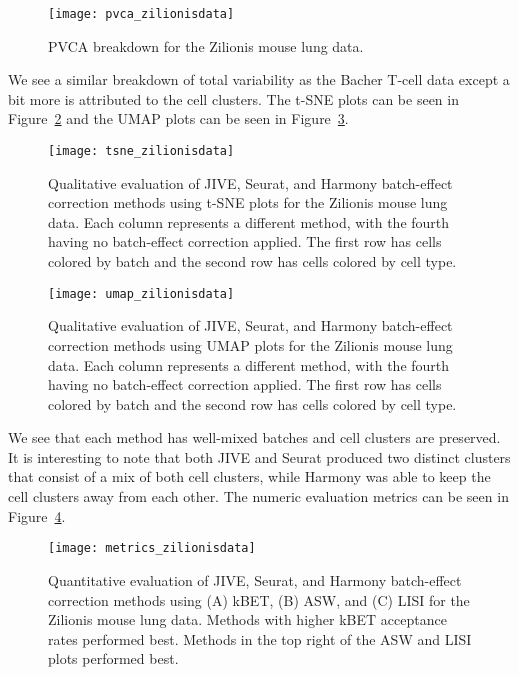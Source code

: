 \documentclass[
12pt, %
letterpaper, %
oneside, %
headinclude,footinclude, %
BCOR5mm, %
]{scrartcl}
\begin{document}
\begin{figure}[H]
    \centering 
    \texttt{[image: pvca\_zilionisdata]} 
    \caption[PVCA Breakdown for the Zilionis Mouse Lung Data]{PVCA breakdown for the Zilionis mouse lung data.}
    \label{fig:pvca_zilionisdata} 
\end{figure}

We see a similar breakdown of total variability as the Bacher T-cell data except a bit more is attributed to the cell clusters. The t-SNE plots can be seen in Figure~\ref{fig:tsne_zilionisdata} and the UMAP plots can be seen in Figure~\ref{fig:umap_zilionisdata}.

\begin{figure}[H]
    \centering 
    \texttt{[image: tsne\_zilionisdata]} 
    \caption[t-SNE Plots for the Zilionis Mouse Lung Data]{Qualitative evaluation of JIVE, Seurat, and Harmony batch-effect correction methods using t-SNE plots for the Zilionis mouse lung data. Each column represents a different method, with the fourth having no batch-effect correction applied. The first row has cells colored by batch and the second row has cells colored by cell type.}
    \label{fig:tsne_zilionisdata}
\end{figure}

\begin{figure}[H]
    \centering 
    \texttt{[image: umap\_zilionisdata]} 
    \caption[UMAP Plots for the Zilionis Mouse Lung Data]{Qualitative evaluation of JIVE, Seurat, and Harmony batch-effect correction methods using UMAP plots for the Zilionis mouse lung data. Each column represents a different method, with the fourth having no batch-effect correction applied. The first row has cells colored by batch and the second row has cells colored by cell type.}
    \label{fig:umap_zilionisdata} 
\end{figure}

We see that each method has well-mixed batches and cell clusters are preserved. It is interesting to note that both JIVE and Seurat produced two distinct clusters that consist of a mix of both cell clusters, while Harmony was able to keep the cell clusters away from each other. The numeric evaluation metrics can be seen in Figure~\ref{fig:metrics_zilionisdata}.

\begin{figure}[H]
    \centering 
    \texttt{[image: metrics\_zilionisdata]} 
    \caption[Metrics for the Zilionis Mouse Lung Data]{Quantitative evaluation of JIVE, Seurat, and Harmony batch-effect correction methods using (A) kBET, (B) ASW, and (C) LISI for the Zilionis mouse lung data. Methods with higher kBET acceptance rates performed best. Methods in the top right of the ASW and LISI plots performed best.}
    \label{fig:metrics_zilionisdata} 
\end{figure}
\end{document}
